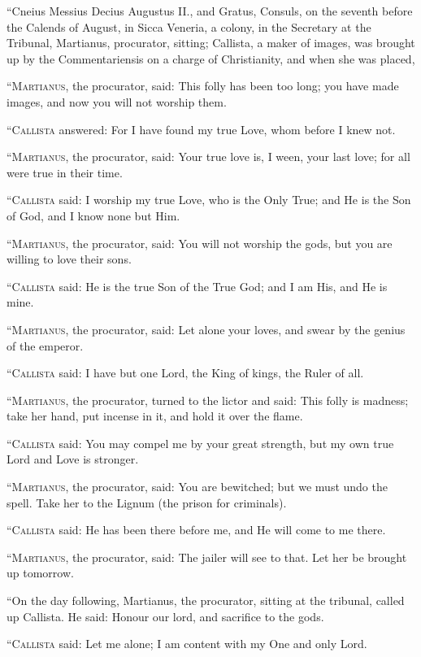 ``Cneius Messius Decius Augustus II., and Gratus, Consuls, on
the seventh before the Calends of August, in Sicca Veneria, a colony,
in the Secretary at the Tribunal, Martianus, procurator, sitting;
Callista, a maker of images, was brought up by the Commentariensis on
a charge of Christianity, and when she was placed,

``M\textsc{artianus}, the procurator, said: This folly has been too
long; you have made images, and now you will not worship them.

``C\textsc{allista} answered: For I have found my true Love, whom before
I knew not.

``M\textsc{artianus}, the procurator, said: Your true love is, I ween,
your last love; for all were true in their time.

``C\textsc{allista} said: I worship my true Love, who is the Only True;
and He is the Son of God, and I know none but Him.

``M\textsc{artianus}, the procurator, said: You will not worship the
gods, but you are willing to love their sons.

``C\textsc{allista} said: He is the true Son of the True God; and I am
His, and He is mine.

``M\textsc{artianus}, the procurator, said: Let alone your loves, and
swear by the genius of the emperor.

``C\textsc{allista} said: I have but one Lord, the King of kings, the
Ruler of all.

``M\textsc{artianus}, the procurator, turned to the lictor and said:
This folly is madness; take her hand, put incense in it, and hold it
over the flame.

``C\textsc{allista} said: You may compel me by your great strength, but
my own true Lord and Love is stronger.

``M\textsc{artianus}, the procurator, said: You are bewitched; but we
must undo the spell. Take her to the Lignum (the prison for
criminals).

``C\textsc{allista} said: He has been there before me, and He will come
to me there.

``M\textsc{artianus}, the procurator, said: The jailer will see to that.
Let her be brought up tomorrow.

``On the day following, Martianus, the procurator, sitting at
the tribunal, called up Callista. He said: Honour our lord, and
sacrifice to the gods.

``C\textsc{allista} said: Let me alone; I am content with my One and
only Lord.

